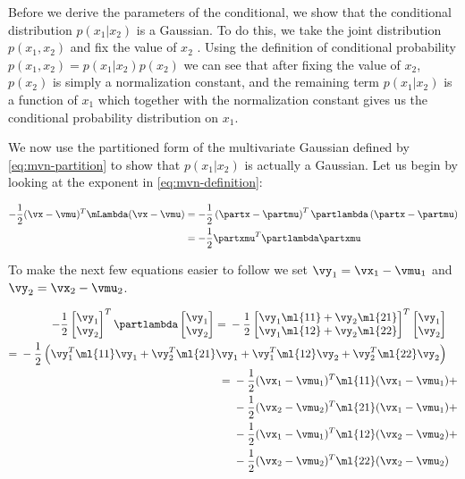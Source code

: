 Before we derive the parameters of the conditional, we show that the
conditional distribution $p(x_1 | x_2)$ is a Gaussian. To do this, we take the
joint distribution $p(x_1, x_2)$ and fix the value of $x_2$
\citep{bishop2016pattern}. Using the definition of conditional probability
$p(x_1, x_2) = p(x_1 | x_2) p(x_2)$ we can see that after fixing the value of
$x_2$, $p(x_2)$ is simply a normalization constant, and the remaining term
$p(x_1 | x_2)$ is a function of $x_1$ which together with the normalization
constant gives us the conditional probability distribution on $x_1$.

We now use the partitioned form of the multivariate Gaussian defined by
\eqref{eq:mvn-partition} to show that $p(x_1 | x_2)$ is actually a Gaussian.
Let us begin by looking at the exponent in \eqref{eq:mvn-definition}:

\begin{align}
  -\frac{1}{2} (\vx - \vmu)^T \mLambda (\vx - \vmu) &=
  -\frac{1}{2} \left(\partx - \partmu \right)^T \partlambda \left(\partx - \partmu \right) \\
                                                    &= -\frac{1}{2} \partxmu^T \partlambda \partxmu
\end{align}

To make the next few equations easier to follow we set $\vy_1 = \vx_1 - \vmu_1$ and $\vy_2 = \vx_2 - \vmu_2$.

\begin{align}
  \begin{split}
    -\frac{1}{2} \begin{bmatrix} \vy_1 \\ \vy_2 \end{bmatrix} ^T \partlambda \begin{bmatrix} \vy_1 \\ \vy_2 \end{bmatrix} ={}& -\frac{1}{2} \begin{bmatrix} \vy_1 \ml{11} + \vy_2 \ml{21} \\ \vy_1 \ml{12} + \vy_2 \ml{22} \end{bmatrix} ^T \begin{bmatrix} \vy_1 \\ \vy_2 \end{bmatrix}
  \end{split} \\
  \begin{split}
    ={}& -\frac{1}{2} \left( \vy_1^T \ml{11} \vy_1 + \vy_2^T \ml{21} \vy_1 + \vy_1^T \ml{12} \vy_2 + \vy_2^T \ml{22} \vy_2 \right)
  \end{split} \\
  \begin{split}
    ={}& -\frac{1}{2} (\vx_1 - \vmu_1)^T \ml{11} (\vx_1 - \vmu_1) {}+ \\
       &-\frac{1}{2} (\vx_2 - \vmu_2)^T \ml{21} (\vx_1 - \vmu_1) {}+ \\
       &-\frac{1}{2} (\vx_1 - \vmu_1)^T \ml{12} (\vx_2 - \vmu_2) {}+ \\
       &-\frac{1}{2} (\vx_2 - \vmu_2)^T \ml{22} (\vx_2 - \vmu_2) \label{eq:mvn-quadratic-form}
  \end{split}
\end{align}

